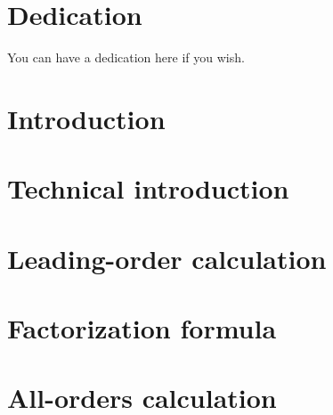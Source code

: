 \documentclass[12pt,twoside]{reedthesis}
\begin{document}
	\chapter*{Dedication}
	You can have a dedication here if you wish.

  \mainmatter %
  \pagestyle{fancyplain} %


\chapter*{Introduction}

	\graphicspath{{introduction/}}
	

	

\chapter{Technical introduction}\label{chap:technical}
	
	\graphicspath{{technical_introduction/}}
	


\chapter{Leading-order calculation}\label{chap:leading order}

	\graphicspath{{leading_order/}}
	


\chapter{Factorization formula}\label{chap:factorization}

	\graphicspath{{factorization/}}
	


\chapter{All-orders calculation}\label{chap:all orders}
	
\end{document}
